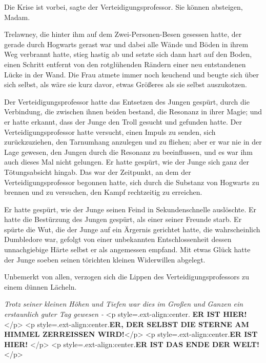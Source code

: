 \glqq{}Die Krise ist vorbei\grqq{}, sagte der Verteidigungsprofessor. \glqq{}Sie
können absteigen, Madam.\grqq{}

Trelawney, die hinter ihm auf dem Zwei-Personen-Besen gesessen hatte, der gerade
durch Hogwarts gerast war und dabei alle Wände und Böden in ihrem Weg verbrannt
hatte, stieg hastig ab und setzte sich dann hart auf den Boden, einen Schritt
entfernt von den rotglühenden Rändern einer neu entstandenen Lücke in der Wand.
Die Frau atmete immer noch keuchend und beugte sich über sich selbst, als wäre
sie kurz davor, etwas Größeres als sie selbst auszukotzen.

Der Verteidigungsprofessor hatte das Entsetzen des Jungen gespürt, durch die
Verbindung, die zwischen ihnen beiden bestand, die Resonanz in ihrer Magie; und
er hatte erkannt, dass der Junge den Troll gesucht und gefunden hatte. Der
Verteidigungsprofessor hatte versucht, einen Impuls zu senden, sich
zurückzuziehen, den Tarnumhang anzulegen und zu fliehen; aber er war nie in der
Lage gewesen, den Jungen durch die Resonanz zu beeinflussen, und es war ihm auch
dieses Mal nicht gelungen. Er hatte gespürt, wie der Junge sich ganz der
Tötungsabsicht hingab. Das war der Zeitpunkt, an dem der Verteidigungsprofessor
begonnen hatte, sich durch die Substanz von Hogwarts zu brennen und zu
versuchen, den Kampf rechtzeitig zu erreichen.

Er hatte gespürt, wie der Junge seinen Feind in Sekundenschnelle auslöschte. Er
hatte die Bestürzung des Jungen gespürt, als einer seiner Freunde starb. Er
spürte die Wut, die der Junge auf ein Ärgernis gerichtet hatte, die
wahrscheinlich Dumbledore war, gefolgt von einer unbekannten Entschlossenheit
dessen unnachgiebige Härte selbst er als angemessen empfand. Mit etwas Glück
hatte der Junge soeben seinen törichten kleinen Widerwillen abgelegt.

Unbemerkt von allen, verzogen sich die Lippen des Verteidigungsprofessors zu
einem dünnen Lächeln.

\emph{Trotz seiner kleinen Höhen und Tiefen war dies im Großen und Ganzen ein
erstaunlich guter Tag gewesen -} <p
style=\grqq{}.ext-align:center\grqq{}.\textbf{ \glqq{}ER IST HIER!}</p> <p
style=\grqq{}.ext-align:center\grqq{}.\textbf{ER, DER SELBST DIE STERNE AM
HIMMEL ZERREISSEN WIRD!}</p> <p style=\grqq{}.ext-align:center\grqq{}.\textbf{ER
IST HIER!} </p> <p style=\grqq{}.ext-align:center\grqq{}.\textbf{ER IST DAS ENDE
DER WELT!\grqq{}} </p>

